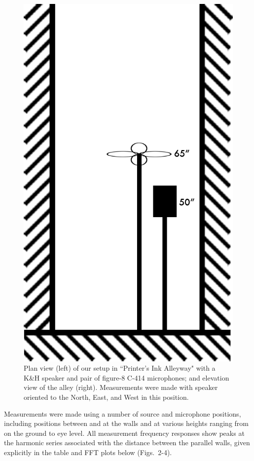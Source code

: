 \documentclass{aes137}
\begin{document}
\begin{figure}
\begin{minipage}[b]{0.41\linewidth}
\includegraphics[width=\textwidth]{images/alleyway_lookingdown.png}
\end{minipage}
\caption{Plan view (left) of our setup in ``Printer's Ink Alleyway" with a K\&H speaker and pair of figure-8 C-414 microphones; and elevation view of the alley (right). Measurements were made with speaker oriented to the North, East, and West in this position.}
\end{figure}

Measurements were made using a number of source and microphone positions, including positions between and at the walls and at various heights ranging from on the ground to eye level. All measurement frequency responses show peaks at the harmonic series associated with the distance between the parallel walls, given explicitly in the table and FFT plots below (Figs.~2-4). 
\end{document}
